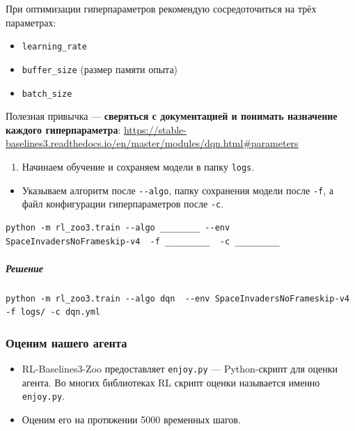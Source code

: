 \documentclass[11pt,a4paper]{article}
\begin{document}
При оптимизации гиперпараметров рекомендую сосредоточиться на трёх параметрах:

\begin{itemize}
\tightlist
\item
\texttt{learning\_rate}
\item
\texttt{buffer\_size} (размер памяти опыта)
\item
\texttt{batch\_size}
\end{itemize}

Полезная привычка --- \textbf{сверяться с документацией и понимать назначение каждого гиперпараметра}: \url{https://stable-baselines3.readthedocs.io/en/master/modules/dqn.html#parameters}

\begin{enumerate}
\def\labelenumi{\arabic{enumi}.}
\setcounter{enumi}{1}
\tightlist
\item
Начинаем обучение и сохраняем модели в папку \texttt{logs}.
\end{enumerate}

\begin{itemize}
\tightlist
\item
Указываем алгоритм после \texttt{-{}-algo}, папку сохранения модели после \texttt{-f}, а файл конфигурации гиперпараметров после \texttt{-c}.
\end{itemize}

\begin{lstlisting}
python -m rl_zoo3.train --algo ________ --env SpaceInvadersNoFrameskip-v4  -f _________  -c _________
\end{lstlisting}

\subparagraph{Решение}\label{solution}

\begin{lstlisting}
python -m rl_zoo3.train --algo dqn  --env SpaceInvadersNoFrameskip-v4 -f logs/ -c dqn.yml
\end{lstlisting}

\subsubsection{Оценим нашего агента}\label{lets-evaluate-our-agent}

\begin{itemize}
\tightlist
\item
RL-Baselines3-Zoo предоставляет \texttt{enjoy.py} --- Python-скрипт для оценки агента. Во многих библиотеках RL скрипт оценки называется именно \texttt{enjoy.py}.
\item
Оценим его на протяжении 5000 временных шагов.
\end{itemize}
\end{document}
